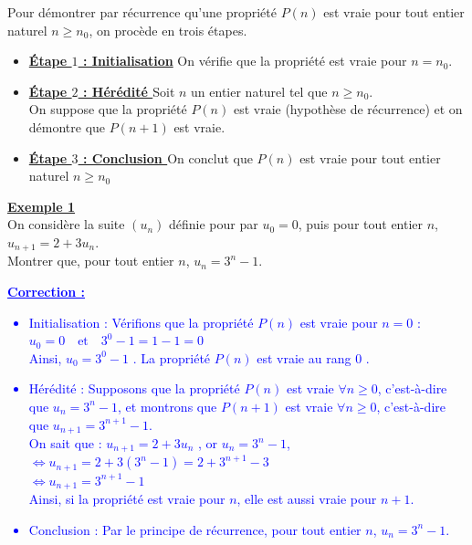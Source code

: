 \documentclass[11pt,twoside, openany]{extbook}
\begin{document}
\begin{tcolorbox}[colback= white, colframe=black!80, title= \section*{Méthode : Démonstration par récurrence}]
\begin{prop}[black][Méthode]
  Pour démontrer par récurrence qu'une propriété $P(n)$ est vraie pour tout entier naturel $n \ge n_0$, on procède en trois étapes.
\begin{itemize}
    \item \textbf{\ul{Étape $1$ : Initialisation}} \quad On vérifie que la propriété est vraie pour $n = n_0$.
    \item \textbf{\ul{ Étape $2$ : Hérédité }} \quad Soit $n$ un entier naturel tel que $n \ge n_0$.\\
On suppose que la propriété $P(n)$ est vraie (hypothèse de récurrence) et on démontre que $P(n + 1)$ est vraie.
    \item \textbf{\ul{ Étape $3$ : Conclusion }} On conclut que $P(n)$ est vraie pour tout entier naturel $n \ge n_0$
\end{itemize}  
\end{prop}
\noindent \textbf{\underline{Exemple 1}}\\
On considère la suite $(u_n)$ définie 
pour par $u_0=0$, puis pour tout entier $n$, $u_{n+1}=2+3u_n$.\\
Montrer que, pour tout entier $n$, $u_n=3^n-1$. 

\textcolor{blue}{\textbf{\underline{Correction :}}
\begin{itemize}
    \item Initialisation : Vérifions que la propriété $P(n)$ est vraie pour  $n = 0$ :
$u_0 = 0 \quad \text{et} \quad 3^0 - 1 = 1 - 1 = 0$ \\
Ainsi, $u_0 = 3^0 - 1$ . La propriété $P(n)$ est vraie au rang  $0$ .
    \item Hérédité : Supposons que la propriété $P(n)$ est vraie $\forall n \geq 0$, c'est-à-dire que $u_n = 3^n - 1$, et montrons que $P(n+1)$ est vraie $\forall n \geq 0$, c'est-à-dire que $u_{n+1} = 3^{n+1} - 1$.\\
On sait que : $u_{n+1} = 2 + 3u_n$ ,  or $u_n = 3^n - 1$, $\iff u_{n+1} = 2 + 3(3^n - 1)= 2 + 3^{n+1} - 3$ \\ $\iff u_{n+1} = 3^{n+1} - 1$ \\
Ainsi, si la propriété est vraie pour $n$, elle est aussi vraie pour $n + 1$.
    \item Conclusion : Par le principe de récurrence, pour tout entier $n$, $u_n=3^n-1$.
\end{itemize}}
\end{tcolorbox}
\end{document}

